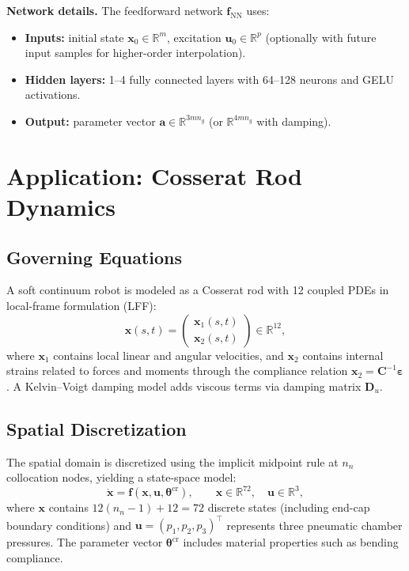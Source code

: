 \documentclass[11pt]{article}
\newcommand{\R}{\mathbb{R}}
\newcommand{\avec}{\bm{a}}
\newcommand{\uvec}{\bm{u}}
\newcommand{\xvec}{\bm{x}}
\newcommand{\fnn}{\bm{f}_{\mathrm{NN}}}
\begin{document}
\noindent\textbf{Network details.} The feedforward network $\fnn$ uses:
\begin{itemize}
    \item \textbf{Inputs:} initial state $\xvec_0 \in \R^m$, excitation $\uvec_0 \in \R^p$ (optionally with future input samples for higher-order interpolation).
    \item \textbf{Hidden layers:} 1--4 fully connected layers with 64--128 neurons and GELU activations.
    \item \textbf{Output:} parameter vector $\avec \in \R^{3 m n_g}$ (or $\R^{4 m n_g}$ with damping).
\end{itemize}

\section{Application: Cosserat Rod Dynamics}
\label{sec:cosserat}

\subsection{Governing Equations}

A soft continuum robot is modeled as a Cosserat rod with 12 coupled PDEs in local-frame formulation (LFF):
\begin{equation}
    \xvec(s, t) = \begin{pmatrix} \xvec_1(s,t) \\ \xvec_2(s,t) \end{pmatrix} \in \R^{12},
\end{equation}
where $\xvec_1$ contains local linear and angular velocities, and $\xvec_2$ contains internal strains related to forces and moments through the compliance relation $\xvec_2 = \bm{C}^{-1} \bm{\varepsilon}$. A Kelvin--Voigt damping model adds viscous terms via damping matrix $\bm{D}_u$.

\subsection{Spatial Discretization}

The spatial domain is discretized using the implicit midpoint rule at $n_n$ collocation nodes, yielding a state-space model:
\begin{equation}
    \dot{\xvec} = \bm{f}(\xvec, \uvec, \bm{\theta}^{\mathrm{cr}}), \qquad \xvec \in \R^{72},\quad \uvec \in \R^3,
    \label{eq:cosserat-ssm}
\end{equation}
where $\xvec$ contains $12(n_n - 1) + 12 = 72$ discrete states (including end-cap boundary conditions) and $\uvec = (p_1, p_2, p_3)^\top$ represents three pneumatic chamber pressures. The parameter vector $\bm{\theta}^{\mathrm{cr}}$ includes material properties such as bending compliance.
\end{document}
